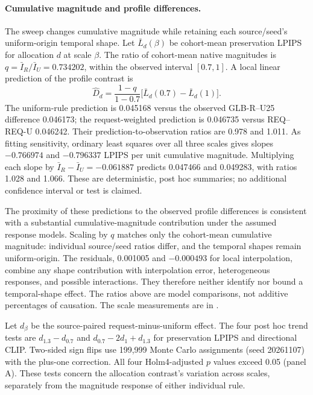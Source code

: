 \documentclass[10pt,doubleanonymous]{ieeeconf}
\begin{document}
\paragraph{Cumulative magnitude and profile differences.}
The sweep changes cumulative magnitude while retaining each source/seed's uniform-origin temporal shape. Let $\bar L_d(\beta)$ be cohort-mean preservation LPIPS for allocation $d$ at scale $\beta$. The ratio of cohort-mean native magnitudes is $q=\bar I_R/\bar I_U=0.734202$, within the observed interval $[0.7,1]$. A local linear prediction of the profile contrast is
\begin{equation}
\widehat D_d=\frac{1-q}{1-0.7}\big[\bar L_d(0.7)-\bar L_d(1)\big].
\end{equation}
The uniform-rule prediction is 0.045168 versus the observed GLB-R--U25 difference 0.046173; the request-weighted prediction is 0.046735 versus REQ--REQ-U 0.046242. Their prediction-to-observation ratios are 0.978 and 1.011. As fitting sensitivity, ordinary least squares over all three scales gives slopes $-0.766974$ and $-0.796337$ LPIPS per unit cumulative magnitude. Multiplying each slope by $\bar I_R-\bar I_U=-0.061887$ predicts 0.047466 and 0.049283, with ratios 1.028 and 1.066. These are deterministic, post hoc summaries; no additional confidence interval or test is claimed.

The proximity of these predictions to the observed profile differences is consistent with a substantial cumulative-magnitude contribution under the assumed response models. Scaling by $q$ matches only the cohort-mean cumulative magnitude: individual source/seed ratios differ, and the temporal shapes remain uniform-origin. The residuals, 0.001005 and $-0.000493$ for local interpolation, combine any shape contribution with interpolation error, heterogeneous responses, and possible interactions. They therefore neither identify nor bound a temporal-shape effect. The ratios above are model comparisons, not additive percentages of causation. The scale measurements are in .

Let $d_\beta$ be the source-paired request-minus-uniform effect. The four post hoc trend tests are $d_{1.3}-d_{0.7}$ and $d_{0.7}-2d_1+d_{1.3}$ for preservation LPIPS and directional CLIP. Two-sided sign flips use 199,999 Monte Carlo assignments (seed 20261107) with the plus-one correction. All four Holm4-adjusted $p$ values exceed 0.05 (panel A). These tests concern the allocation contrast's variation across scales, separately from the magnitude response of either individual rule.
\end{document}
